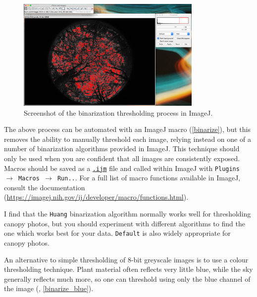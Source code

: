 \documentclass[11pt,a4paper]{article}
\newcommand\menu[1]{\texttt{\color{blue}#1}}  %
\newcommand\file[1]{\texttt{\underline{#1}}}  %
\begin{document}
\begin{figure}[H]
\centering
	\includegraphics[width=0.8\textwidth]{threshold}
	\caption{Screenshot of the binarization thresholding process in ImageJ.}
	\label{threshold}
\end{figure}

The above process can be automated with an ImageJ macro (\autoref{binarize}), but this removes the ability to manually threshold each image, relying instead on one of a number of binarization algorithms provided in ImageJ. This technique should only be used when you are confident that all images are consistently exposed. Macros should be saved as a \file{.ijm} file and called within ImageJ with \menu{Plugins $\rightarrow$ Macros $\rightarrow$ Run..}. For a full list of macro functions available in ImageJ, consult the documentation (\url{https://imagej.nih.gov/ij/developer/macro/functions.html}). 

\begin{minipage}{\linewidth}

\end{minipage}

I find that the \verb|Huang| \citep{Huang1995} binarization algorithm normally works well for thresholding canopy photos, but you should experiment with different algorithms to find the one which works best for your data. \verb|Default| is also widely appropriate for canopy photos.

An alternative to simple thresholding of 8-bit greyscale images is to use a colour thresholding technique. Plant material often reflects very little blue, while the sky generally reflects much more, so one can threshold using only the blue channel of the image (\citealt{Brusa2014}, \autoref{binarize_blue}).
\end{document}
